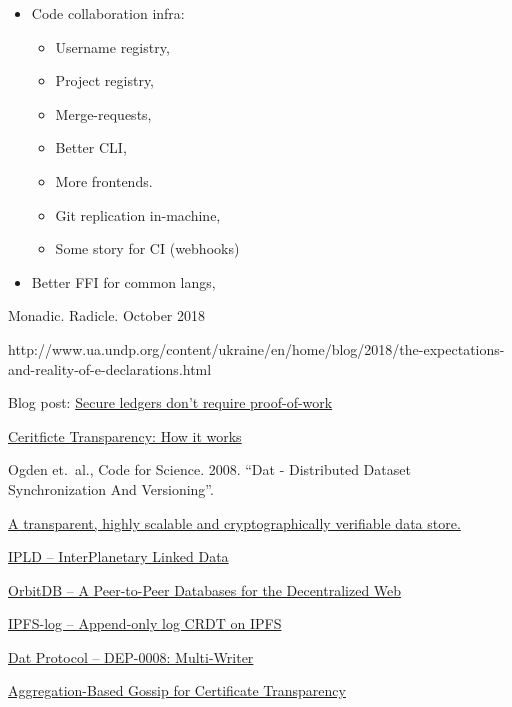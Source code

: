 \documentclass[a4paper, oneside, 10pt]{amsart}
\begin{document}
\begin{itemize}
\item
  Code collaboration infra:
  \begin{itemize}
  \item
    Username registry,
  \item
    Project registry,
  \item
    Merge-requests,
  \item
    Better CLI,
  \item
    More frontends.
  \item
    Git replication in-machine,
  \item
    Some story for CI (webhooks)
  \end{itemize}
\item
  Better FFI for common langs,
\end{itemize}

\begin{thebibliography}{9}

 Monadic. Radicle. October 2018

  http://www.ua.undp.org/content/ukraine/en/home/blog/2018/the-expectations-and-reality-of-e-declarations.html

 Blog post:
  \href{https://pfrazee.github.io/blog/secure-ledgers-dont-require-proof-of-work}{Secure
    ledgers don't require proof-of-work}

  \href{https://www.certificate-transparency.org/how-ct-works}{Ceritficte Transparency: How it works}

  Ogden et.~al., Code for Science. 2008. ``Dat - Distributed Dataset Synchronization And Versioning''.

  \href{https://github.com/google/trillian}{A transparent, highly scalable and cryptographically verifiable data store.}

  \href{https://github.com/ipld/ipld}{IPLD -- InterPlanetary Linked Data}

  \href{https://github.com/orbitdb/orbit-db}{OrbitDB -- A Peer-to-Peer Databases for the Decentralized Web}

  \href{https://github.com/orbitdb/ipfs-log}{IPFS-log -- Append-only log CRDT on IPFS}

  \href{https://www.datprotocol.com/deps/0008-multiwriter/}{Dat Protocol -- DEP-0008: Multi-Writer}

  \href{https://arxiv.org/pdf/1806.08817.pdf}{Aggregation-Based Gossip for Certificate Transparency}
  
\end{thebibliography}
\end{document}

